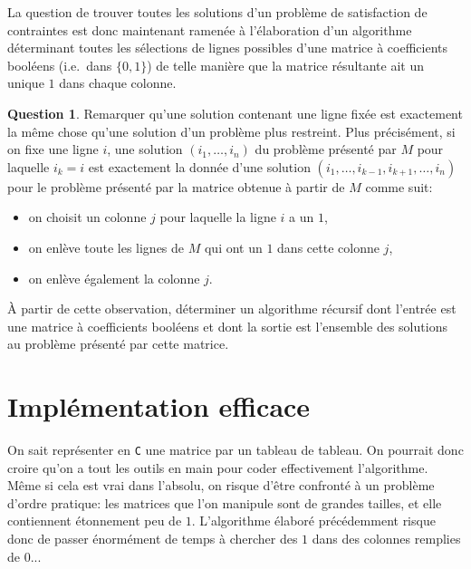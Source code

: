 \documentclass[french,a4paper]{article}
\theoremstyle{definition}
\newtheorem{question}{Question}
\theoremstyle{remark}
\begin{document}
La question de trouver toutes les solutions d'un problème de
satisfaction de contraintes est donc maintenant ramenée à
l'élaboration d'un algorithme déterminant toutes les sélections de
lignes possibles d'une matrice à coefficients booléens (i.e.\ dans
$\{0,1\}$) de telle manière que la matrice résultante ait un unique
$1$ dans chaque colonne.

\begin{question}
  \label{question:recursive-matrix}%
  Remarquer qu'une solution contenant une ligne fixée est exactement
  la même chose qu'une solution d'un problème plus restreint. Plus
  précisément, si on fixe une ligne $i$, une solution
  $(i_1,\dots,i_n)$ du problème présenté par $M$ pour laquelle $i_k=i$
  est exactement la donnée d'une solution
  $(i_1,\dots,i_{k-1},i_{k+1},\dots,i_n)$ pour le problème présenté
  par la matrice obtenue à partir de $M$ comme suit:
  \begin{itemize}
  \item on choisit un colonne $j$ pour laquelle la ligne $i$ a un $1$,
  \item on enlève toute les lignes de $M$ qui ont un $1$ dans cette
    colonne $j$,
  \item on enlève également la colonne $j$.
  \end{itemize}

  \`A partir de cette observation, déterminer un algorithme récursif
  dont l'entrée est une matrice à coefficients booléens et dont la
  sortie est l'ensemble des solutions au problème présenté par cette
  matrice.
\end{question}

\section{Implémentation efficace}
\label{sec:dlx}

On sait représenter en {\tt C} une matrice par un tableau de
tableau. On pourrait donc croire qu'on a tout les outils en main pour
coder effectivement l'algorithme. Même si cela est vrai dans l'absolu,
on risque d'être confronté à un problème d'ordre pratique: les
matrices que l'on manipule sont de grandes tailles, et elle
contiennent étonnement peu de $1$. L'algorithme élaboré précédemment
risque donc de passer énormément de temps à chercher des $1$ dans des
colonnes remplies de $0$...
\end{document}
